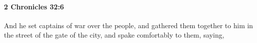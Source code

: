 
		\paragraph{2 Chronicles 32:6} %
			\label{2CHRONICLES-32-6}

			And he set captains of war over the people, and gathered them together to him in the street of the gate of the city, and spake comfortably to them, saying,


